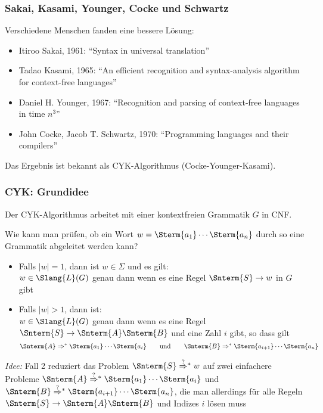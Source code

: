 \documentclass[aspectratio=1610,onlymath]{beamer}
\begin{document}
\begin{frame}\frametitle{Sakai, Kasami, Younger, Cocke und Schwartz}

Verschiedene Menschen fanden eine bessere Lösung:
\begin{itemize}
\item Itiroo Sakai, 1961: "`Syntax in universal translation"'
\item Tadao Kasami, 1965: "`An efficient recognition and syntax-analysis algorithm for context-free languages"'
\item Daniel H. Younger, 1967: "`Recognition and parsing of context-free languages in time $n^3$"'
\item John Cocke, Jacob T. Schwartz, 1970: "`Programming languages and their compilers"'
\end{itemize}
\bigskip

\alert{Das Ergebnis ist bekannt als CYK-Algorithmus (Cocke-Younger-Kasami).}

\end{frame}

\newcommand{\Rightarrowstarquest}{\mathrel{{\stackrel{?}{\Rightarrow}}{}^*}}

\begin{frame}\frametitle{CYK: Grundidee}

Der CYK-Algorithmus arbeitet mit einer kontextfreien Grammatik $G$ in CNF.
\bigskip

\alert{Wie kann man prüfen, ob ein Wort $w=\Sterm{a_1}\cdots\Sterm{a_n}$ durch so eine Grammatik abgeleitet werden kann?}
\pause

\begin{itemize}
\item Falls $|w|=1$, dann ist $w\in\Sigma$ und es gilt:\\
$w\in\Slang{L}(G)$ genau dann wenn es eine Regel $\Snterm{S}\to w$ in $G$ gibt\pause
\item Falls $|w|>1$, dann ist:\\
$w\in\Slang{L}(G)$ genau dann wenn es eine Regel
$\Snterm{S}\to\Snterm{A}\Snterm{B}$ und eine Zahl $i$ gibt, so dass gilt
\[\Snterm{A}\Rightarrow^* \Sterm{a_1}\cdots\Sterm{a_i}\qquad\text{und}\qquad \Snterm{B}\Rightarrow^* \Sterm{a_{i+1}}\cdots\Sterm{a_n}\]
\end{itemize}\pause

\emph{Idee:} Fall 2 reduziert das Problem $\Snterm{S}\Rightarrowstarquest w$ auf zwei einfachere Probleme
$\Snterm{A}\Rightarrowstarquest \Sterm{a_1}\cdots\Sterm{a_i}$ und $\Snterm{B}\Rightarrowstarquest \Sterm{a_{i+1}}\cdots\Sterm{a_n}$, die man allerdings für alle Regeln $\Snterm{S}\to\Snterm{A}\Snterm{B}$ und Indizes $i$ lösen muss

\end{frame}
\end{document}
